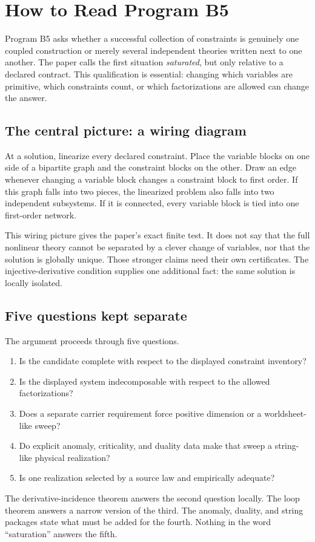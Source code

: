 \documentclass[11pt]{article}
\begin{document}
\section{How to Read Program B5}

Program B5 asks whether a successful collection of constraints is genuinely
one coupled construction or merely several independent theories written next
to one another.  The paper calls the first situation \emph{saturated}, but
only relative to a declared contract.  This qualification is essential:
changing which variables are primitive, which constraints count, or which
factorizations are allowed can change the answer.

\subsection{The central picture: a wiring diagram}

At a solution, linearize every declared constraint.  Place the variable blocks
on one side of a bipartite graph and the constraint blocks on the other.  Draw
an edge whenever changing a variable block changes a constraint block to
first order.  If this graph falls into two pieces, the linearized problem also
falls into two independent subsystems.  If it is connected, every variable
block is tied into one first-order network.

This wiring picture gives the paper's exact finite test.  It does not say that
the full nonlinear theory cannot be separated by a clever change of
variables, nor that the solution is globally unique.  Those stronger claims
need their own certificates.  The injective-derivative condition supplies one
additional fact: the same solution is locally isolated.

\subsection{Five questions kept separate}

The argument proceeds through five questions.
\begin{enumerate}
\item Is the candidate complete with respect to the displayed constraint
inventory?
\item Is the displayed system indecomposable with respect to the allowed
factorizations?
\item Does a separate carrier requirement force positive dimension or a
worldsheet-like sweep?
\item Do explicit anomaly, criticality, and duality data make that sweep a
string-like physical realization?
\item Is one realization selected by a source law and empirically adequate?
\end{enumerate}
The derivative-incidence theorem answers the second question locally.  The
loop theorem answers a narrow version of the third.  The anomaly, duality, and
string packages state what must be added for the fourth.  Nothing in the word
``saturation'' answers the fifth.
\end{document}

